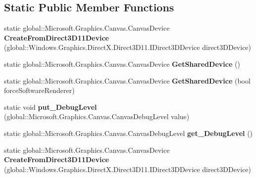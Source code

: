 \subsection*{Static Public Member Functions}
\begin{DoxyCompactItemize}
\item 
\mbox{\label{class_microsoft_1_1_graphics_1_1_canvas_1_1_canvas_device_ac34f7ec06b15bc5f366d17073c7a044b}} 
static global\+::\+Microsoft.\+Graphics.\+Canvas.\+Canvas\+Device {\bfseries Create\+From\+Direct3\+D11\+Device} (global\+::\+Windows.\+Graphics.\+Direct\+X.\+Direct3\+D11.\+I\+Direct3\+D\+Device direct3\+D\+Device)
\item 
\mbox{\label{class_microsoft_1_1_graphics_1_1_canvas_1_1_canvas_device_a773190aa560cbf1b1dc04ae5b544481f}} 
static global\+::\+Microsoft.\+Graphics.\+Canvas.\+Canvas\+Device {\bfseries Get\+Shared\+Device} ()
\item 
\mbox{\label{class_microsoft_1_1_graphics_1_1_canvas_1_1_canvas_device_acb468348f5f4cc3993e0cda3133a3756}} 
static global\+::\+Microsoft.\+Graphics.\+Canvas.\+Canvas\+Device {\bfseries Get\+Shared\+Device} (bool force\+Software\+Renderer)
\item 
\mbox{\label{class_microsoft_1_1_graphics_1_1_canvas_1_1_canvas_device_ab9c64c019ceb46a0ce7750c7672266bf}} 
static void {\bfseries put\+\_\+\+Debug\+Level} (global\+::\+Microsoft.\+Graphics.\+Canvas.\+Canvas\+Debug\+Level value)
\item 
\mbox{\label{class_microsoft_1_1_graphics_1_1_canvas_1_1_canvas_device_ab81e13bacbccaa108210dc500f9f64fd}} 
static global\+::\+Microsoft.\+Graphics.\+Canvas.\+Canvas\+Debug\+Level {\bfseries get\+\_\+\+Debug\+Level} ()
\item 
\mbox{\label{class_microsoft_1_1_graphics_1_1_canvas_1_1_canvas_device_ac34f7ec06b15bc5f366d17073c7a044b}} 
static global\+::\+Microsoft.\+Graphics.\+Canvas.\+Canvas\+Device {\bfseries Create\+From\+Direct3\+D11\+Device} (global\+::\+Windows.\+Graphics.\+Direct\+X.\+Direct3\+D11.\+I\+Direct3\+D\+Device direct3\+D\+Device)

\end{DoxyCompactItemize}
